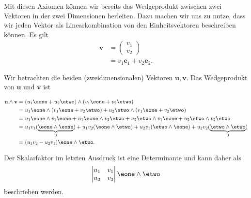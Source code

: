 Mit diesen Axiomen können wir bereits das Wedgeprodukt zwischen zwei
Vektoren in der zwei Dimensionen herleiten.
Dazu machen wir uns zu nutze, dass wir jeden Vektor als
Linearkombination von den Einheitsvektoren beschreiben können.
Es gilt
\begin{align}
  \mathbf{v} &= \begin{pmatrix} v_1 \\ v_2 \end{pmatrix} \\
    &= v_1 \mathbf{e}_1 + v_2 \mathbf{e}_2.
\end{align}

\begin{definition}
  Wir betrachten die beiden (zweidimensionalen) Vektoren $\mathbf{u},
  \mathbf{v}$.
  Das Wedgeprodukt von $\mathbf{u}$ und $\mathbf{v}$ ist

  \begin{equation}
    \begin{aligned}
    \mathbf{u} \wedge \mathbf{v} &= (u_1 \eone + u_2 \etwo) \wedge
    (v_1 \eone + v_2 \etwo) \\
    &= u_1 \eone \wedge (v_1 \eone + v_2 \etwo) + u_2 \etwo \wedge (v_1 \eone + v_2 \etwo) \\
    &= u_1 \eone \wedge v_1 \eone + u_1 \eone \wedge v_2 \etwo + u_2 \etwo \wedge v_1 \eone + u_2 \etwo \wedge v_2 \etwo \\
    &= u_1 v_1 (\underbrace{\eone \wedge \eone}_{0}) + u_1 v_2 (\eone \wedge \etwo) + u_2 v_1 (\etwo \wedge \eone) + u_2 v_2 (\underbrace{\etwo \wedge \etwo}_{0}) \\
    &= (u_1 v_2 - u_2 v_1) \eone \wedge \etwo.
    \end{aligned}
  \end{equation}
\end{definition}

Der Skalarfaktor im letzten Ausdruck ist eine Determinante und kann daher als
\begin{equation}
  \begin{vmatrix}
    u_1 & v_1 \\
    u_2 & v_2
  \end{vmatrix}
  \eone \wedge \etwo
\end{equation}
beschrieben werden.

